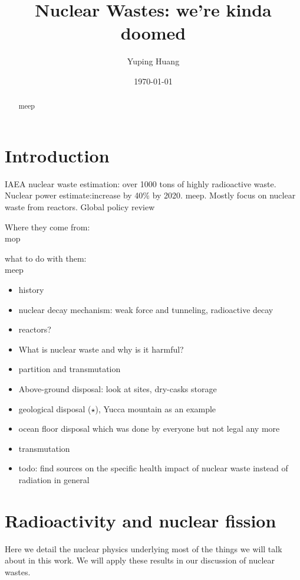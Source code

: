 \documentclass[preprint,aip,pra]{revtex4-1}
\begin{document}
\title{Nuclear Wastes: we're kinda doomed}

\author{Yuping Huang}%

\date{\today}%
\begin{abstract}
    meep
\end{abstract}
\maketitle
\tableofcontents
\newpage

\section{Introduction}
IAEA nuclear waste estimation: over 1000 tons of highly radioactive waste.\cite{iaea08}
Nuclear power estimate:increase by 40\% by 2020. \cite{iaea12}
meep. Mostly focus on nuclear waste from reactors.
Global policy review \cite{r12} 

Where they come from:\\
mop

what to do with them:\\
meep

\begin{itemize}
    \item history
    \item nuclear decay mechanism: weak force and tunneling, radioactive decay
    \item reactors?
    \item What is nuclear waste and why is it harmful?
    \item partition and transmutation
    \item Above-ground disposal: look at sites, dry-casks storage
    \item geological disposal ($\star$), Yucca mountain as an example
    \item ocean floor disposal which was done by everyone but not legal any more
    \item transmutation
    \item todo: find sources on the specific health impact of nuclear waste instead of radiation
        in general
\end{itemize}

\section{Radioactivity and nuclear fission}
    Here we detail the nuclear physics underlying most of the things we will talk about
    in this work. We will apply these results in our discussion of nuclear wastes.
\end{document}
